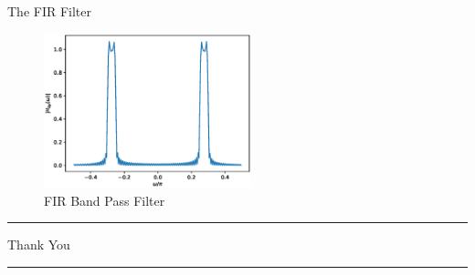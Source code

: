 \documentclass{beamer}
\begin{document}
\begin{frame}{The FIR Filter}

\begin{figure}
    \centering
    \includegraphics[width=6cm]{figs/FIR_bandpass.eps}
    \caption{FIR Band Pass Filter}
\end{figure}

\noindent
{ \rule{\linewidth}{0.5mm} }
\Huge{\centerline{Thank You}}
\noindent
{ \rule{\linewidth}{0.5mm} }
\end{frame}
\end{document}

